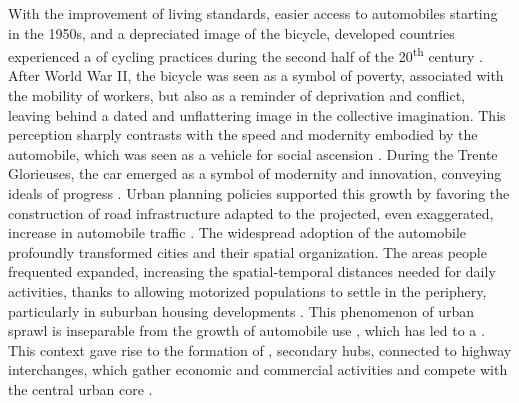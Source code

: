 \begin{refsegment}
With the improvement of living standards, easier access to automobiles starting in the 1950s, and a depreciated image of the bicycle, developed countries experienced a  of cycling practices during the second half of the 20\textsuperscript{th} century \textcolor{blue}{\autocites[59-84]{heran_retour_2015}[9-10]{heran_retour_2024}}. After World War II, the bicycle was seen as a symbol of poverty, associated with the mobility of workers, but also as a reminder of deprivation and conflict, leaving behind a dated and unflattering image in the collective imagination. This \gls{perception} sharply contrasts with the speed and modernity embodied by the automobile, which was seen as a vehicle for social ascension \textcolor{blue}{\autocite[59]{bertho-lavenir_scarcity_2015}}. During the Trente Glorieuses, the car emerged as a symbol of modernity and innovation, conveying ideals of progress \textcolor{blue}{\autocite[35]{flonneau_georges_1999}}. Urban planning policies supported this growth by favoring the construction of road infrastructure adapted to the projected, even exaggerated, increase in automobile traffic \textcolor{blue}{\autocite[58]{wiel_transition_1999}}. The widespread adoption of the automobile profoundly transformed cities and their spatial organization. The areas people frequented expanded, increasing the spatial-temporal distances needed for daily activities, thanks to  allowing motorized populations to settle in the periphery, particularly in suburban housing developments \textcolor{blue}{\autocite[58]{wiel_transition_1999}}. This phenomenon of urban sprawl is inseparable from the growth of automobile use \textcolor{blue}{\autocites[8]{newman_land_1996}[3]{aragau_periurbain_2018}}, which has led to a  \textcolor{blue}{\autocite[20]{wiel_transition_1999}}. This context gave rise to the formation of , secondary  hubs, connected to highway interchanges, which gather economic and commercial activities and compete with the central urban core \textcolor{blue}{\autocite[]{garreau_edge_1991}}.%


\end{refsegment}
